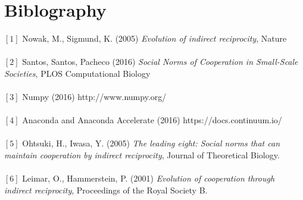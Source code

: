 \documentclass[10pt,a4paper]{article}
\begin{document}
\section{Biblography}
$[1]$ Nowak, M., Sigmund, K. (2005) \textit{Evolution of indirect reciprocity}, Nature \\\\
$[2]$ Santos, Santos, Pacheco (2016) \textit{Social Norms of Cooperation in Small-Scale Societies}, PLOS Computational Biology \\\\
$[3]$ Numpy (2016) http://www.numpy.org/ \\\\
$[4]$ Anaconda and Anaconda Accelerate (2016) https://docs.continuum.io/ \\\\
$[5]$ Ohtsuki, H., Iwasa, Y. (2005) \textit{The leading eight: Social norms that can maintain cooperation by indirect reciprocity}, Journal of Theoretical Biology. \\\\
$[6]$ Leimar, O., Hammerstein, P. (2001) \textit{Evolution of cooperation through indirect reciprocity}, Proceedings of the Royal Society B. \\\\
\end{document}
